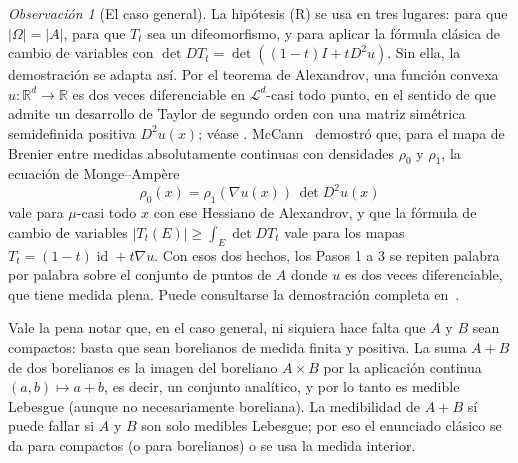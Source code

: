 \documentclass[12pt, a4paper]{amsbook}
\newcommand{\id}{\operatorname{id}}
\newcommand{\R}{{\mathbb R}}
\theoremstyle{remark}
\newtheorem{obs}[teo]{Observación}
\theoremstyle{definition}
\numberwithin{section}{chapter}
\numberwithin{subsection}{section}
\numberwithin{equation}{section}
\numberwithin{figure}{chapter}
\begin{document}
\begin{obs}[El caso general]\label{obs.BM.general}
La hipótesis (R) se usa en tres lugares: para que $|\Omega|=|A|$, para que
$T_t$ sea un difeomorfismo, y para aplicar la fórmula clásica de cambio de
variables con $\det DT_t=\det((1-t)I+tD^2u)$. Sin ella, la demostración se
adapta así. Por el teorema de Alexandrov, una función convexa
$u\colon\R^d\to\R$ es dos veces diferenciable en $\mathcal L^d$-casi todo
punto, en el sentido de que admite un desarrollo de Taylor de segundo orden
con una matriz simétrica semidefinida positiva $D^2u(x)$; véase
\cite[Theorem~6.9]{EvansGariepy}. McCann~\cite{McCann1997} demostró que, para
el mapa de Brenier entre medidas absolutamente continuas con densidades
$\rho_0$ y $\rho_1$, la ecuación de Monge--Ampère
\[
\rho_0(x)=\rho_1(\nabla u(x))\,\det D^2u(x)
\]
vale para $\mu$-casi todo $x$ con ese Hessiano de Alexandrov, y que la
fórmula de cambio de variables $|T_t(E)|\ge\int_E\det DT_t$ vale para los
mapas $T_t=(1-t)\id+t\nabla u$. Con esos dos hechos, los Pasos 1 a 3 se
repiten palabra por palabra sobre el conjunto de puntos de $A$ donde $u$ es
dos veces diferenciable, que tiene medida plena. Puede consultarse la
demostración completa en~\cite[Chapter~6]{Villani2003}.

Vale la pena notar que, en el caso general, ni siquiera hace falta que $A$ y
$B$ sean compactos: basta que sean borelianos de medida finita y positiva. La
suma $A+B$ de dos borelianos es la imagen del boreliano $A\times B$ por la
aplicación continua $(a,b)\mapsto a+b$, es decir, un conjunto analítico, y
por lo tanto es medible Lebesgue (aunque no necesariamente boreliana). La
medibilidad de $A+B$ sí puede fallar si $A$ y $B$ son solo medibles
Lebesgue; por eso el enunciado clásico se da para compactos (o para
borelianos) o se usa la medida interior.
\end{obs}
\end{document}
